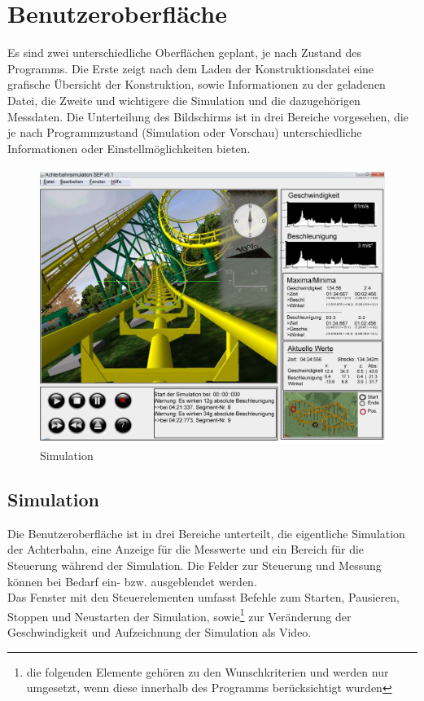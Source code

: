 
\chapter{Benutzeroberfläche}
Es sind zwei unterschiedliche Oberflächen geplant, je nach Zustand des Programms. Die Erste zeigt nach dem Laden der Konstruktionsdatei eine grafische Übersicht der Konstruktion, sowie Informationen zu der geladenen Datei, die Zweite und wichtigere die Simulation und die dazugehörigen Messdaten. Die Unterteilung des Bildschirms ist in drei Bereiche vorgesehen, die je nach Programmzustand (Simulation oder Vorschau) unterschiedliche Informationen oder Einstellmöglichkeiten bieten.
\begin{figure}[!h]%
\includegraphics[width=0.8\linewidth]{./bilder/GUI_v2.jpg}%
\caption{Simulation}%
\label{Simulation}%
\end{figure}
\section*{Simulation}

Die Benutzeroberfläche ist in drei Bereiche unterteilt, die eigentliche Simulation der Achterbahn, eine Anzeige für die Messwerte und ein Bereich für die Steuerung während der Simulation. Die Felder zur Steuerung und Messung können bei Bedarf ein- bzw. ausgeblendet werden.\\
Das Fenster mit den Steuerelementen umfasst Befehle zum Starten, Pausieren, Stoppen und Neustarten der Simulation, sowie\footnote{die folgenden Elemente gehören zu den Wunschkriterien und werden nur umgesetzt, wenn diese innerhalb des Programms berücksichtigt wurden} zur Veränderung der Geschwindigkeit und Aufzeichnung der Simulation als Video.

